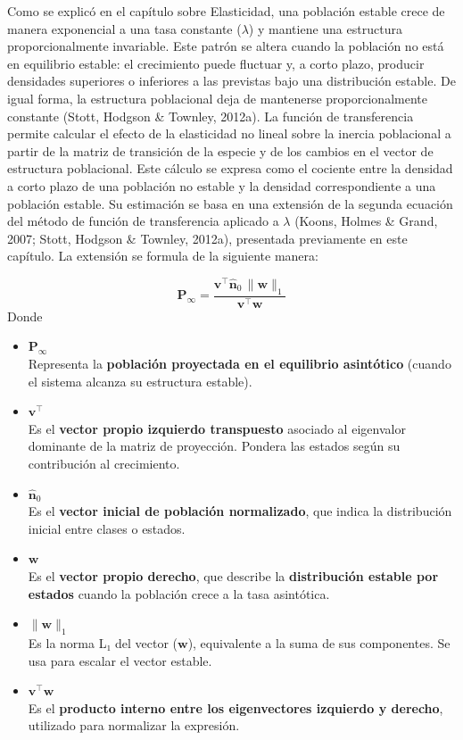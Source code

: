 \documentclass[
  12pt,
  letterpaper,
]{book}
\begin{document}
Como se explicó en el capítulo sobre Elasticidad, una población estable
crece de manera exponencial a una tasa constante (\(\lambda\)) y
mantiene una estructura proporcionalmente invariable. Este patrón se
altera cuando la población no está en equilibrio estable: el crecimiento
puede fluctuar y, a corto plazo, producir densidades superiores o
inferiores a las previstas bajo una distribución estable. De igual
forma, la estructura poblacional deja de mantenerse proporcionalmente
constante (Stott, Hodgson \& Townley, 2012a). La función de
transferencia permite calcular el efecto de la elasticidad no lineal
sobre la inercia poblacional a partir de la matriz de transición de la
especie y de los cambios en el vector de estructura poblacional. Este
cálculo se expresa como el cociente entre la densidad a corto plazo de
una población no estable y la densidad correspondiente a una población
estable. Su estimación se basa en una extensión de la segunda ecuación
del método de función de transferencia aplicado a \(\lambda\) (Koons,
Holmes \& Grand, 2007; Stott, Hodgson \& Townley, 2012a), presentada
previamente en este capítulo. La extensión se formula de la siguiente
manera:

\[
\mathbf{P}_\infty = \frac{\mathbf{v}^\top \hat{\mathbf{n}}_0 \, \|\mathbf{w}\|_1}{\mathbf{v}^\top \mathbf{w}}
\] Donde

\begin{itemize}
\item
  \(\mathbf{P}_\infty\)\\
  Representa la \textbf{población proyectada en el equilibrio
  asintótico} (cuando el sistema alcanza su estructura estable).
\item
  \(\mathbf{v}^\top\)\\
  Es el \textbf{vector propio izquierdo transpuesto} asociado al
  eigenvalor dominante de la matriz de proyección. Pondera las estados
  según su contribución al crecimiento.
\item
  \(\hat{\mathbf{n}}_0\)\\
  Es el \textbf{vector inicial de población normalizado}, que indica la
  distribución inicial entre clases o estados.
\item
  \(\mathbf{w}\)\\
  Es el \textbf{vector propio derecho}, que describe la
  \textbf{distribución estable por estados} cuando la población crece a
  la tasa asintótica.
\item
  \(\|\mathbf{w}\|_1\)\\
  Es la norma L₁ del vector (\(\mathbf{w}\)), equivalente a la suma de
  sus componentes. Se usa para escalar el vector estable.
\item
  \(\mathbf{v}^\top \mathbf{w}\)\\
  Es el \textbf{producto interno entre los eigenvectores izquierdo y
  derecho}, utilizado para normalizar la expresión.
\end{itemize}
\end{document}
